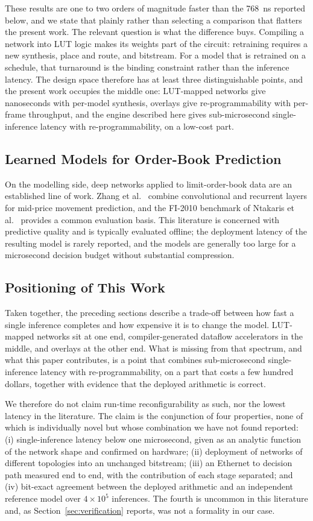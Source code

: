 \documentclass[final,5p,times,twocolumn]{elsarticle}
\begin{document}
These results are one to two orders of magnitude faster than the
\SI{768}{\nano\second} reported below, and we state that plainly rather than
selecting a comparison that flatters the present work. The relevant question is
what the difference buys. Compiling a network into LUT logic makes its weights
part of the circuit: retraining requires a new synthesis, place and route, and
bitstream. For a model that is retrained on a schedule, that turnaround is the
binding constraint rather than the inference latency. The design space therefore
has at least three distinguishable points, and the present work occupies the
middle one: LUT-mapped networks give nanoseconds with per-model synthesis,
overlays give re-programmability with per-frame throughput, and the engine
described here gives sub-microsecond single-inference latency with
re-programmability, on a low-cost part.

\subsection{Learned Models for Order-Book Prediction}
On the modelling side, deep networks applied to limit-order-book data are an
established line of work. Zhang et al.~\cite{Zhang2019} combine convolutional
and recurrent layers for mid-price movement prediction, and the FI-2010
benchmark of Ntakaris et al.~\cite{Ntakaris2018} provides a common evaluation
basis. This literature is concerned with predictive quality and is typically
evaluated offline; the deployment latency of the resulting model is rarely
reported, and the models are generally too large for a microsecond decision
budget without substantial compression.

\subsection{Positioning of This Work}
Taken together, the preceding sections describe a trade-off between how fast a
single inference completes and how expensive it is to change the model.
LUT-mapped networks sit at one end, compiler-generated dataflow accelerators in
the middle, and overlays at the other end. What is missing from that spectrum,
and what this paper contributes, is a point that combines sub-microsecond
single-inference latency with re-programmability, on a part that costs a few
hundred dollars, together with evidence that the deployed arithmetic is correct.

We therefore do not claim run-time reconfigurability as such, nor the lowest
latency in the literature. The claim is the conjunction of four properties, none
of which is individually novel but whose combination we have not found reported:
(i) single-inference latency below one microsecond, given as an analytic
function of the network shape and confirmed on hardware; (ii) deployment of
networks of different topologies into an unchanged bitstream; (iii) an Ethernet
to decision path measured end to end, with the contribution of each stage
separated; and (iv) bit-exact agreement between the deployed arithmetic and an
independent reference model over $4\times10^{5}$ inferences. The fourth is
uncommon in this literature and, as Section~\ref{sec:verification} reports, was
not a formality in our case.
\end{document}
